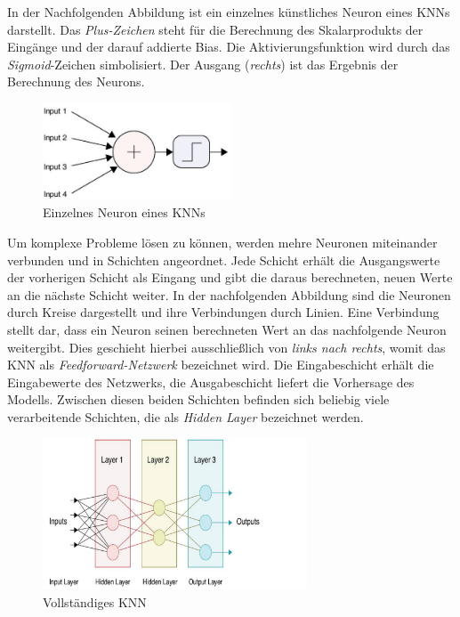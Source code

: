 In der Nachfolgenden Abbildung ist ein einzelnes künstliches Neuron eines \acp{KNN} darstellt. Das \emph{Plus-Zeichen} steht für die Berechnung des Skalarprodukts der Eingänge und der darauf addierte Bias. Die Aktivierungsfunktion wird durch das \emph{Sigmoid}-Zeichen simbolisiert. Der Ausgang (\emph{rechts}) ist das Ergebnis der Berechnung des Neurons. \cite{visualApproach}

\begin{figure}[H]
   \centering
   \includegraphics[width=0.5\textwidth]{images/KNNs/Neuron.png}
   \caption{Einzelnes Neuron eines \acp{KNN} \cite{visualApproach}}
\end{figure}

Um komplexe Probleme lösen zu können, werden mehre Neuronen miteinander verbunden und in Schichten angeordnet. Jede Schicht erhält die Ausgangswerte der vorherigen Schicht als Eingang und gibt die daraus berechneten, neuen Werte an die nächste Schicht weiter. In der nachfolgenden Abbildung sind die Neuronen durch Kreise dargestellt und ihre Verbindungen durch Linien. Eine Verbindung stellt dar, dass ein Neuron seinen berechneten Wert an das nachfolgende Neuron weitergibt. Dies geschieht hierbei ausschließlich von \emph{links nach rechts}, womit das \ac{KNN} als \emph{Feedforward-Netzwerk} bezeichnet wird. Die Eingabeschicht erhält die Eingabewerte des Netzwerks, die Ausgabeschicht liefert die Vorhersage des Modells. Zwischen diesen beiden Schichten befinden sich beliebig viele verarbeitende Schichten, die als \emph{Hidden Layer} bezeichnet werden. \cite{knnsKompakt}

\begin{figure}[H]
   \centering
   \includegraphics[width=0.7\textwidth]{images/KNNs/KNN_layers.png}
   \caption{Vollständiges \ac{KNN} \cite{visualApproach}}
\end{figure}

